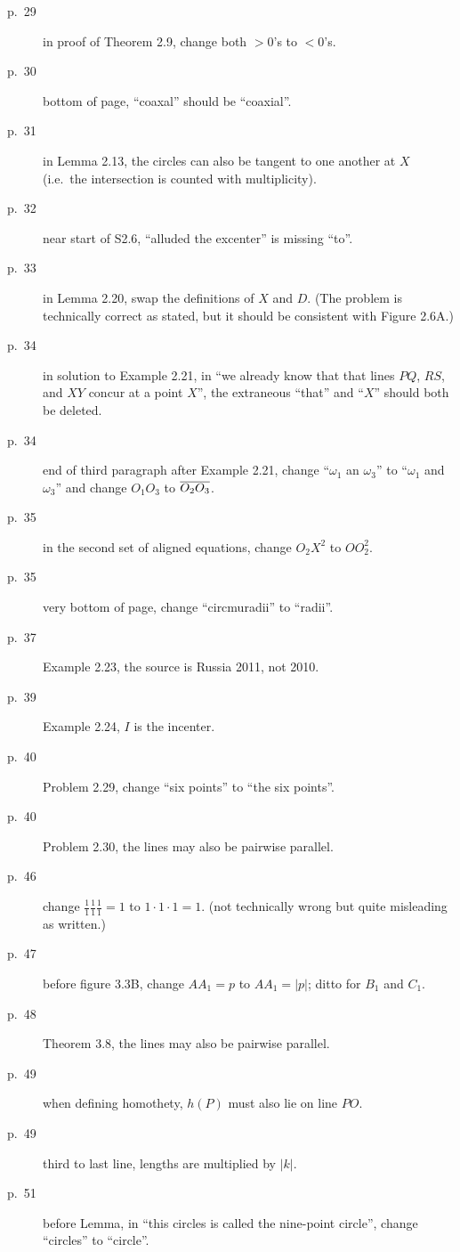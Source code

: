 \documentclass[11pt]{scrartcl}
\begin{document}
\begin{description}
\item[p.\  29] in proof of Theorem 2.9, change both $>0$'s to $<0$'s.
\item[p.\  30] bottom of page, ``coaxal'' should be ``coaxial''.
\item[p.\  31] in Lemma 2.13, the circles can also be tangent
  to one another at $X$ (i.e.\ the intersection is counted with multiplicity).
\item[p.\  32] near start of S2.6, ``alluded the excenter'' is missing ``to''.
\item[p.\  33] in Lemma 2.20, swap the definitions of $X$ and $D$.
  (The problem is technically correct as stated,
  but it should be consistent with Figure 2.6A.)
\item[p.\  34] in solution to Example 2.21, in
  ``we already know that that lines $PQ$, $RS$, and $XY$ concur at a point $X$'',
  the extraneous ``that'' and ``$X$'' should both be deleted.
\item[p.\  34] end of third paragraph after Example 2.21,
  change ``$\omega_1$ an $\omega_3$'' to ``$\omega_1$ and $\omega_3$''
  and change $O_1O_3$ to $\overline{O_2O_3}$.
\item[p.\  35] in the second set of aligned equations,
  change $O_2X^2$ to $OO_2^2$.
\item[p.\  35] very bottom of page, change ``circmuradii'' to ``radii''.
\item[p.\  37] Example 2.23, the source is Russia 2011, not 2010.
\item[p.\  39] Example 2.24, $I$ is the incenter.
\item[p.\  40] Problem 2.29, change ``six points'' to ``the six points''.
\item[p.\  40] Problem 2.30, the lines may also be pairwise parallel.
\item[p.\  46] change $\frac 11 \frac 11 \frac 11 = 1$ to $1 \cdot 1 \cdot 1 = 1$.
  (not technically wrong but quite misleading as written.)
\item[p.\  47] before figure 3.3B, change $AA_1=p$ to $AA_1=|p|$; ditto for $B_1$ and $C_1$.
\item[p.\  48] Theorem 3.8, the lines may also be pairwise parallel.
\item[p.\  49] when defining homothety, $h(P)$ must also lie on line $PO$.
\item[p.\  49] third to last line, lengths are multiplied by $|k|$.
\item[p.\  51] before Lemma, in ``this circles is called the nine-point circle'',
  change ``circles'' to ``circle''.

\end{description}
\end{document}
